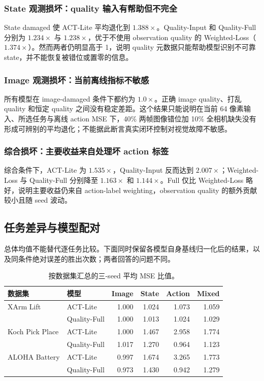 \documentclass[11pt,a4paper,fontset=fandol]{ctexart}
\begin{document}
\subsubsection{State 观测损坏：quality 输入有帮助但不完全}

State damaged 使 ACT-Lite 平均退化到 $1.388\times$。Quality-Input 和 Quality-Full 分别为 $1.234\times$ 与 $1.238\times$，优于不使用 observation quality 的 Weighted-Loss（$1.374\times$）。然而两者仍明显高于 1，说明 quality 元数据只能帮助模型识别不可靠 state，并不能恢复被错位或置零的信息。

\subsubsection{Image 观测损坏：当前离线指标不敏感}

所有模型在 image-damaged 条件下都约为 $1.0\times$。正确 image quality、打乱 quality 和恒定 quality 之间没有稳定差距。这个结果只能说明在当前 64 像素输入、所选任务与离线 action MSE 下，40\% 两帧图像错位加 10\% 全相机缺失没有形成可辨别的平均退化；不能据此断言真实闭环控制对视觉故障不敏感。

\subsubsection{综合损坏：主要收益来自处理坏 action 标签}

综合条件下，ACT-Lite 为 $1.535\times$，Quality-Input 反而达到 $2.007\times$；Weighted-Loss 与 Quality-Full 分别降至 $1.163\times$ 和 $1.144\times$。Full 仅比 Weighted-Loss 略好，说明主要收益仍来自 action-label weighting，observation quality 的额外贡献较小且随 seed 波动。
\clearpage\subsection{任务差异与模型配对}
总体均值不能替代逐任务比较。下面同时保留各模型自身基线归一化后的结果，以及同条件绝对误差的胜出次数；两者回答的问题不同。

\begin{table}[H]
\centering
\scriptsize
\begin{tabular}{p{32mm}p{31mm}rrrr}
\toprule
数据集 & 模型 & Image & State & Action & Mixed\\
\midrule
XArm Lift & ACT-Lite & 1.000 & 1.024 & 1.073 & 1.059\\
 & Quality-Full & 1.000 & 1.013 & 1.024 & 1.029\\
Koch Pick Place & ACT-Lite & 1.000 & 1.467 & 2.958 & 1.774\\
 & Quality-Full & 1.017 & 1.270 & 0.964 & 1.123\\
ALOHA Battery & ACT-Lite & 0.997 & 1.674 & 3.265 & 1.773\\
 & Quality-Full & 0.973 & 1.430 & 0.942 & 1.279\\
\bottomrule
\end{tabular}
\caption{按数据集汇总的三-seed 平均 MSE 比值。}
\end{table}
\end{document}
